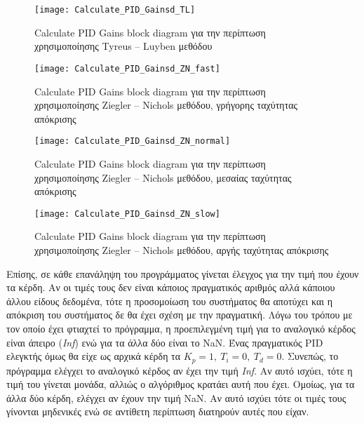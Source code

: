 \begin{figure}[h]
  \centering
  \texttt{[image: Calculate\_PID\_Gainsd\_TL]}
  \caption{Calculate PID Gains block diagram για την περίπτωση χρησιμοποίησης Tyreus -- Luyben μεθόδου}
  \label{fig:Calculate_PID_Gainsd_TL}
\end{figure}

\begin{figure}[h!]
  \centering
  \texttt{[image: Calculate\_PID\_Gainsd\_ZN\_fast]}
  \caption{Calculate PID Gains block diagram για την περίπτωση χρησιμοποίησης Ziegler -- Nichols μεθόδου, γρήγορης ταχύτητας απόκρισης}
  \label{fig:Calculate_PID_Gainsd_ZN_fast}
\end{figure}

\begin{figure}[h]
  \centering
  \texttt{[image: Calculate\_PID\_Gainsd\_ZN\_normal]}
  \caption{Calculate PID Gains block diagram για την περίπτωση χρησιμοποίησης Ziegler -- Nichols μεθόδου, μεσαίας ταχύτητας απόκρισης}
  \label{fig:Calculate_PID_Gainsd_ZN_normal}
\end{figure}

\begin{figure}[h!]
  \centering
  \texttt{[image: Calculate\_PID\_Gainsd\_ZN\_slow]}
  \caption{Calculate PID Gains block diagram για την περίπτωση χρησιμοποίησης Ziegler -- Nichols μεθόδου, αργής ταχύτητας απόκρισης}
  \label{fig:Calculate_PID_Gainsd_ZN_slow}
\end{figure}

Επίσης, σε κάθε επανάληψη του προγράμματος γίνεται έλεγχος για την τιμή που έχουν τα κέρδη. Αν οι τιμές τους δεν είναι κάποιος πραγματικός αριθμός αλλά κάποιου άλλου είδους δεδομένα, τότε η προσομοίωση του συστήματος θα αποτύχει και η απόκριση του συστήματος δε θα έχει σχέση με την πραγματική. Λόγω του τρόπου με τον οποίο έχει φτιαχτεί το πρόγραμμα, η προεπιλεγμένη τιμή για το αναλογικό κέρδος είναι άπειρο (\emph{Inf}) ενώ για τα άλλα δύο είναι το NaN. Ένας πραγματικός PID ελεγκτής όμως θα είχε ως αρχικά κέρδη τα $K_p = 1,\ T_i = 0,\ T_d = 0$. Συνεπώς, το πρόγραμμα ελέγχει το αναλογικό κέρδος αν έχει την τιμή \textit{Inf}. Αν αυτό ισχύει, τότε η τιμή του γίνεται μονάδα, αλλιώς ο αλγόριθμος κρατάει αυτή που έχει. Ομοίως, για τα άλλα δύο κέρδη, ελέγχει αν έχουν την τιμή NaN. Αν αυτό ισχύει τότε οι τιμές τους γίνονται μηδενικές ενώ σε αντίθετη περίπτωση διατηρούν αυτές που είχαν.

